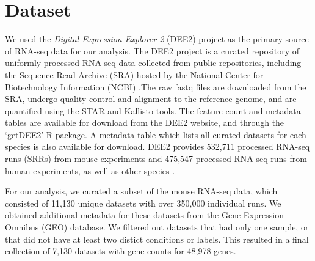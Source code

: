 
\section{Dataset}

We used the \emph{Digital Expression Explorer 2} (DEE2) project as the primary source of
RNA-seq data for our analysis. The DEE2 project is a curated repository of uniformly
processed RNA-seq data collected from public repositories, including the Sequence
Read Archive (SRA) hosted by the National Center for Biotechnology Information (NCBI)
\cite{DEE2}.The raw fastq files are downloaded from the SRA, undergo quality control and
alignment to the reference genome, and are quantified using the STAR and Kallisto tools.
The feature count and metadata tables are available for download from the DEE2 website,
and through the `getDEE2' R package. A metadata table which lists all curated datasets
for each species is also available for download. DEE2 provides 532,711 processed RNA-seq
runs (SRRs) from mouse experiments and 475,547 processed RNA-seq runs from human
experiments, as well as other species \cite{DEE2}.

For our analysis, we curated a subset of the mouse RNA-seq data, which consisted of
11,130 unique datasets with over 350,000 individual runs. We obtained additional
metadata for these datasets from the Gene Expression Omnibus (GEO) database. We
filtered out datasets that had only one sample, or that did not have at least two
distict conditions or labels. This resulted in a final collection of 7,130 datasets
with gene counts for 48,978 genes.
